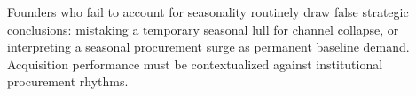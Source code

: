 Founders who fail to account for seasonality routinely draw false strategic conclusions: mistaking a temporary seasonal lull for channel collapse, or interpreting a seasonal procurement surge as permanent baseline demand. Acquisition performance must be contextualized against institutional procurement rhythms.
